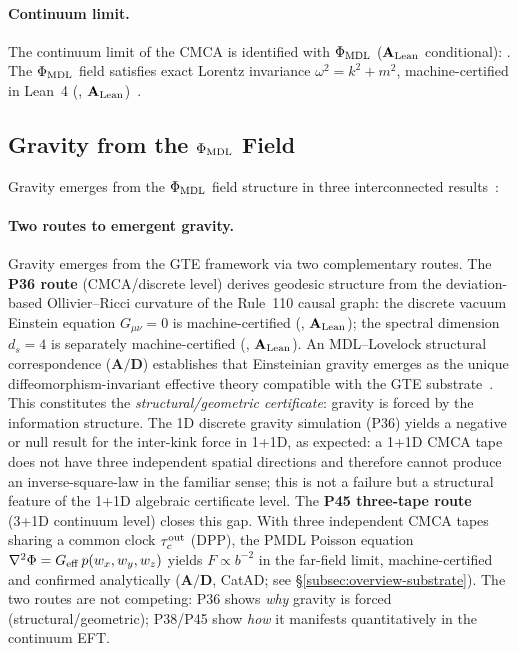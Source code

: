 \paragraph{Continuum limit.}
The continuum limit of the CMCA is identified with $\Phi_{\rm MDL}$
($\mathbf{A}_{\rm Lean}$ conditional): .  The
$\Phi_{\rm MDL}$ field satisfies exact Lorentz invariance $\omega^2 = k^2 + m^2$,
machine-certified in Lean~4 (,
$\mathbf{A}_{\rm Lean}$)~\cite{SpivackCMCA,SpivackPhiMDLField}.

\subsection{Gravity from the \texorpdfstring{$\Phi_{\rm MDL}$}{Phi\_MDL} Field}
\label{subsec:overview-gravity}

Gravity emerges from the $\Phi_{\rm MDL}$ field structure in three interconnected
results~\cite{SpivackPhiMDLGravity,SpivackCompleteness}:

\paragraph{Two routes to emergent gravity.}
Gravity emerges from the GTE framework via two complementary routes.
The \textbf{P36 route} (CMCA/discrete level) derives geodesic structure from the
deviation-based Ollivier--Ricci curvature of the Rule~110 causal graph:
the discrete vacuum Einstein equation $G_{\mu\nu}=0$ is machine-certified
(, $\mathbf{A}_{\rm Lean}$); the spectral
dimension $d_s = 4$ is separately machine-certified
(, $\mathbf{A}_{\rm Lean}$).
An MDL--Lovelock structural correspondence ($\mathbf{A/D}$) establishes that
Einsteinian gravity emerges as the unique diffeomorphism-invariant effective
theory compatible with the GTE substrate~\cite{SpivackEmergentGravity}.
This constitutes the \emph{structural/geometric certificate}: gravity is
forced by the information structure.
The 1D discrete gravity simulation (P36) yields a negative or null result for the inter-kink
force in 1+1D, as expected: a 1+1D CMCA tape does not have three independent spatial directions
and therefore cannot produce an inverse-square-law in the familiar sense; this is not a failure
but a structural feature of the 1+1D algebraic certificate level.
The \textbf{P45 three-tape route} (3+1D continuum level) closes this gap.
With three independent CMCA tapes sharing a common clock $\tau_c^{\rm out}$ (DPP),
the PMDL Poisson equation $\nabla^2\Phi = G_{\rm eff}\,p(w_x,w_y,w_z)$ yields
$F\propto b^{-2}$ in the far-field limit, machine-certified and confirmed analytically
($\mathbf{A/D}$, CatAD; see \S\ref{subsec:overview-substrate}).
The two routes are not competing: P36 shows \emph{why} gravity is forced (structural/geometric);
P38/P45 show \emph{how} it manifests quantitatively in the continuum EFT.

